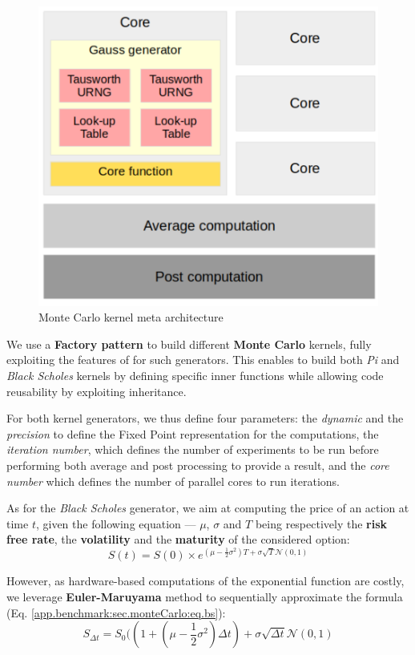         \begin{figure}[h!]
            \centering
            \includegraphics[width=.6\textwidth]{Figures/monteCarloCore.png}
            \caption{Monte Carlo kernel meta architecture}
            \label{app.benchmark:sec.monteCarlo:fig.kernel}
        \end{figure}

        We use a {\bf Factory pattern} to build different {\bf Monte Carlo} kernels, fully exploiting the  features of \chisel{} for such generators.
        This enables to build both {\it Pi} and {\it Black Scholes} kernels by defining specific inner functions while allowing code reusability by exploiting inheritance.

        For both kernel generators, we thus define four parameters: the {\it dynamic} and the {\it precision} to define the Fixed Point representation for the computations, the {\it iteration number}, which defines the number of experiments to be run before performing both average and post processing to provide a result, and the {\it core number} which defines the number of parallel cores to run iterations.

        As for the {\it Black Scholes} generator, we aim at computing the price of an action at time $t$, given the following equation --- $\mu$, $\sigma$ and $T$ being respectively the {\bf risk free rate}, the {\bf volatility} and the {\bf maturity} of the considered option:
        \begin{equation}
            \label{app.benchmark:sec.monteCarlo:eq.bs}
            S(t) = S(0)\times e^{(\mu - \frac{1}{2}\sigma^2)T + \sigma\sqrt{T}\mathcal{N}(0, 1)}
        \end{equation} 
        
        However, as  hardware-based computations of the exponential function are costly, we leverage {\bf Euler-Maruyama} method to sequentially approximate the formula (Eq. \ref{app.benchmark:sec.monteCarlo:eq.bs}):
        \begin{equation}
            \label{app.benchmark:sec.monteCarlo:eq.bsem}
            S_{\Delta t} = S_0((1 + (\mu - \frac{1}{2}\sigma^2)\Delta t) + \sigma\sqrt{\Delta t}\mathcal{N}(0, 1)
        \end{equation}

